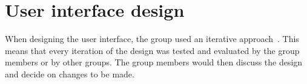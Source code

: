 \section{User interface design}\label{sec:user-interface-design}

When designing the user interface, the group used an iterative approach~\cite{iterative-design}.
This means that every iteration of the design was tested and evaluated by the group members or by other groups.
The group members would then discuss the design and decide on changes to be made.







